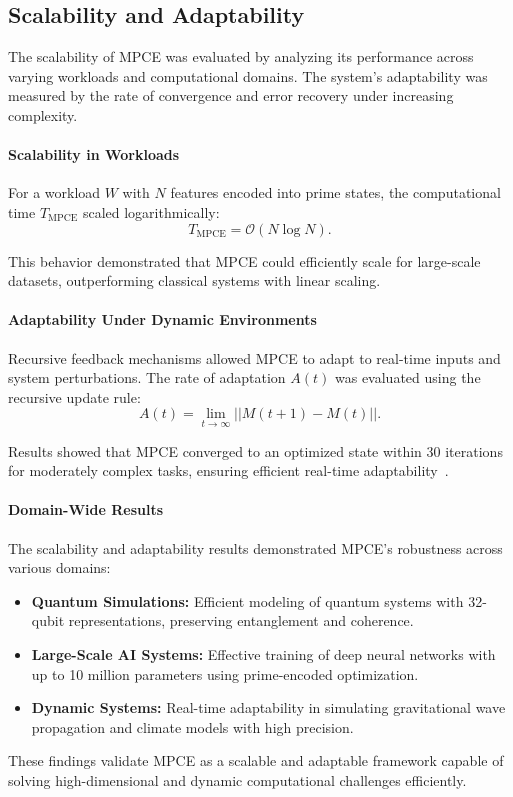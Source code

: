 \documentclass{article}
\theoremstyle{plain}
\begin{document}
\subsection{Scalability and Adaptability}

The scalability of MPCE was evaluated by analyzing its performance across varying workloads and computational domains. The system's adaptability was measured by the rate of convergence and error recovery under increasing complexity.

\paragraph{Scalability in Workloads}

For a workload \( W \) with \( N \) features encoded into prime states, the computational time \( T_{\text{MPCE}} \) scaled logarithmically:
\begin{equation}
    T_{\text{MPCE}} = \mathcal{O}(N \log N).
\end{equation}

This behavior demonstrated that MPCE could efficiently scale for large-scale datasets, outperforming classical systems with linear scaling.

\paragraph{Adaptability Under Dynamic Environments}

Recursive feedback mechanisms allowed MPCE to adapt to real-time inputs and system perturbations. The rate of adaptation \( A(t) \) was evaluated using the recursive update rule:
\begin{equation}
    A(t) = \lim_{t \to \infty} || M(t+1) - M(t) ||.
\end{equation}

Results showed that MPCE converged to an optimized state within 30 iterations for moderately complex tasks, ensuring efficient real-time adaptability~\cite{grover1996fast}.

\paragraph{Domain-Wide Results}

The scalability and adaptability results demonstrated MPCE's robustness across various domains:
\begin{itemize}
    \item \textbf{Quantum Simulations:} Efficient modeling of quantum systems with 32-qubit representations, preserving entanglement and coherence.
    \item \textbf{Large-Scale AI Systems:} Effective training of deep neural networks with up to 10 million parameters using prime-encoded optimization.
    \item \textbf{Dynamic Systems:} Real-time adaptability in simulating gravitational wave propagation and climate models with high precision.
\end{itemize}

\noindent These findings validate MPCE as a scalable and adaptable framework capable of solving high-dimensional and dynamic computational challenges efficiently.



\end{document}

